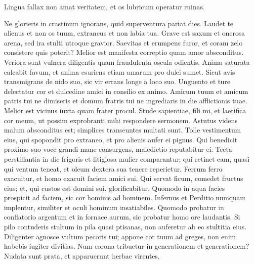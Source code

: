 \begin{biblechapter}
\begin{biblechapter}
\begin{biblechapter}
\begin{biblechapter}
\begin{biblechapter}
\begin{biblechapter}
\begin{biblechapter}
\begin{biblechapter}
\begin{biblechapter}
\begin{biblechapter}
\begin{biblechapter}
\begin{biblechapter}
\begin{biblechapter}
\begin{biblechapter}
\begin{biblechapter}
\begin{biblechapter}
\begin{biblechapter}
\begin{biblechapter}
\begin{biblechapter}
\begin{biblechapter}
\begin{biblechapter}
\begin{biblechapter}
\begin{biblechapter}
\begin{biblechapter}
\begin{biblechapter}
\begin{biblechapter}
 \verse Lingua fallax non amat veritatem,
 et os lubricum operatur ruinas.
 
\begin{biblechapter}
 \verse Ne glorieris in crastinum
 ignorans, quid superventura pariat dies.
 \verse Laudet te alienus et non os tuum,
 extraneus et non labia tua.
 \verse Grave est saxum et onerosa arena,
 sed ira stulti utroque gravior.
 \verse Saevitas et erumpens furor,
 et coram zelo consistere quis poterit?
 \verse Melior est manifesta correptio
 quam amor absconditus.
 \verse Veriora sunt vulnera diligentis
 quam fraudulenta oscula odientis.
 \verse Anima saturata calcabit favum,
 et anima esuriens etiam amarum pro dulci sumet.
 \verse Sicut avis transmigrans de nido suo,
 sic vir errans longe a loco suo.
 \verse Unguento et ture delectatur cor
 et dulcedine amici in consilio ex animo.
 \verse Amicum tuum et amicum patris tui ne dimiseris
 et domum fratris tui ne ingrediaris in die afflictionis tuae.
 Melior est vicinus iuxta quam frater procul.
 \verse Stude sapientiae, fili mi, et laetifica cor meum,
 ut possim exprobranti mihi respondere sermonem.
 \verse Astutus videns malum absconditus est;
 simplices transeuntes multati sunt.
 \verse Tolle vestimentum eius, qui spopondit pro extraneo,
 et pro alienis aufer ei pignus.
 \verse Qui benedicit proximo suo voce grandi mane consurgens,
 maledictio reputabitur ei.
 \verse Tecta perstillantia in die frigoris
 et litigiosa mulier comparantur;
 \verse qui retinet eam, quasi qui ventum teneat,
 et oleum dextera sua tenere reperietur.
 \verse Ferrum ferro exacuitur,
 et homo exacuit faciem amici sui.
 \verse Qui servat ficum, comedet fructus eius;
 et, qui custos est domini sui, glorificabitur.
 \verse Quomodo in aqua facies prospicit ad faciem,
 sic cor hominis ad hominem.
 \verse Infernus et Perditio numquam implentur,
 similiter et oculi hominum insatiabiles.
 \verse Quomodo probatur in conflatorio argentum et in fornace aurum,
 sic probatur homo ore laudantis.
 \verse Si pilo contuderis stultum in pila quasi ptisanas,
 non auferetur ab eo stultitia eius.
 \verse Diligenter agnosce vultum pecoris tui;
 appone cor tuum ad greges,
 \verse non enim habebis iugiter divitias.
 Num corona tribuetur in generationem et generationem?
 \verse Nudata sunt prata, et apparuerunt herbae virentes,

\end{biblechapter}
\end{biblechapter}
\end{biblechapter}
\end{biblechapter}
\end{biblechapter}
\end{biblechapter}
\end{biblechapter}
\end{biblechapter}
\end{biblechapter}
\end{biblechapter}
\end{biblechapter}
\end{biblechapter}
\end{biblechapter}
\end{biblechapter}
\end{biblechapter}
\end{biblechapter}
\end{biblechapter}
\end{biblechapter}
\end{biblechapter}
\end{biblechapter}
\end{biblechapter}
\end{biblechapter}
\end{biblechapter}
\end{biblechapter}
\end{biblechapter}
\end{biblechapter}
\end{biblechapter}
